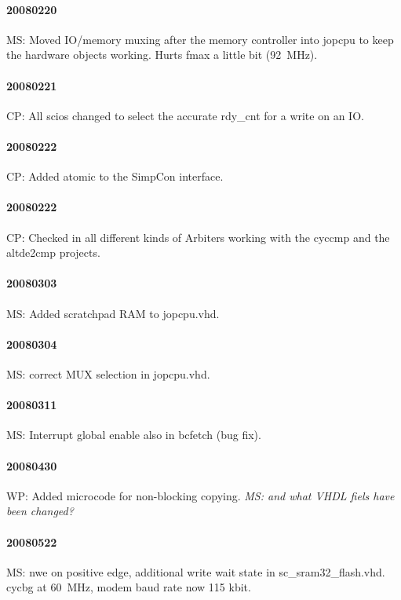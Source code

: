 \documentclass[a4paper,12pt]{scrartcl}
\newcommand{\code}[1]{{\textsf{#1}}}
\begin{document}
\paragraph{20080220} MS: Moved IO/memory muxing after the memory controller into
\code{jopcpu} to keep the hardware objects working. Hurts fmax a
little bit (92~MHz).

\paragraph{20080221} CP: All scios changed to select the accurate rdy\_cnt for a write
on an IO.

\paragraph{20080222} CP: Added atomic to the SimpCon interface.

\paragraph{20080222} CP: Checked in all different kinds of Arbiters working with the
\code{cyccmp} and the \code{altde2cmp} projects.

\paragraph{20080303} MS: Added scratchpad RAM to \code{jopcpu.vhd}.

\paragraph{20080304} MS: correct MUX selection in \code{jopcpu.vhd}.

\paragraph{20080311} MS: Interrupt global enable also in \code{bcfetch} (bug
fix).

\paragraph{20080430} WP: Added microcode for non-blocking copying.
\emph{MS: and what VHDL fiels have been changed?}

\paragraph{20080522} MS: \code{nwe} on positive edge, additional
write wait state in \code{sc\_sram32\_flash.vhd}. \code{cycbg} at
60~MHz, modem baud rate now 115 kbit.
\end{document}
